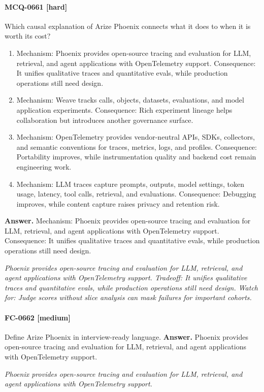 \paragraph{MCQ-0661 [hard]} Which causal explanation of Arize Phoenix connects what it does to when it is worth its cost?
\begin{enumerate}[label=\Alph*.]
\item Mechanism: Phoenix provides open-source tracing and evaluation for LLM, retrieval, and agent applications with OpenTelemetry support. Consequence: It unifies qualitative traces and quantitative evals, while production operations still need design.
\item Mechanism: Weave tracks calls, objects, datasets, evaluations, and model application experiments. Consequence: Rich experiment lineage helps collaboration but introduces another governance surface.
\item Mechanism: OpenTelemetry provides vendor-neutral APIs, SDKs, collectors, and semantic conventions for traces, metrics, logs, and profiles. Consequence: Portability improves, while instrumentation quality and backend cost remain engineering work.
\item Mechanism: LLM traces capture prompts, outputs, model settings, token usage, latency, tool calls, retrieval, and evaluations. Consequence: Debugging improves, while content capture raises privacy and retention risk.
\end{enumerate}
\noindent\textbf{Answer.} Mechanism: Phoenix provides open-source tracing and evaluation for LLM, retrieval, and agent applications with OpenTelemetry support. Consequence: It unifies qualitative traces and quantitative evals, while production operations still need design.
\par\textit{Phoenix provides open-source tracing and evaluation for LLM, retrieval, and agent applications with OpenTelemetry support. Tradeoff: It unifies qualitative traces and quantitative evals, while production operations still need design. Watch for: Judge scores without slice analysis can mask failures for important cohorts.}
\paragraph{FC-0662 [medium]} Define Arize Phoenix in interview-ready language.
\noindent\textbf{Answer.} Phoenix provides open-source tracing and evaluation for LLM, retrieval, and agent applications with OpenTelemetry support.
\par\textit{Phoenix provides open-source tracing and evaluation for LLM, retrieval, and agent applications with OpenTelemetry support.}
